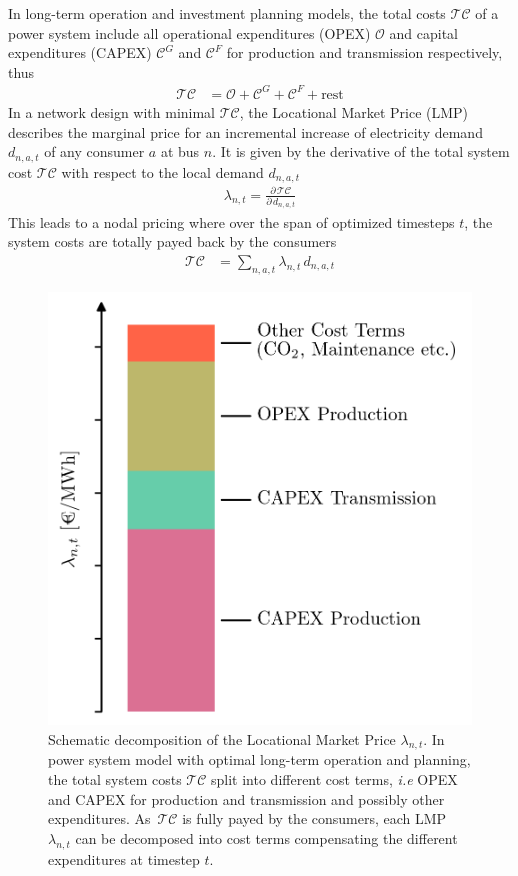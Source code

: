 \documentclass[11pt,twocolumn]{article}
\newcommand{\demand}[1][n]{d_{#1,a,t}}
\newcommand{\lmp}[1][n]{\lambda_{#1,t}}
\newcommand{\totalcost}{\mathcal{TC}}
\newcommand{\totalOpexGeneration}{\mathcal{O}}
\newcommand{\totalCapexGeneration}{\mathcal{C}^G}
\newcommand{\totalCapexFlow}{\mathcal{C}^F}
\newcommand{\pdv}[2]{\frac{\partial #1}{\partial #2}}
\begin{document}
In long-term operation and investment planning models, the total costs $\totalcost$ of a power system include all operational expenditures (OPEX) $\totalOpexGeneration$ and capital expenditures (CAPEX) $\totalCapexGeneration$ and $\totalCapexFlow$ for production  and transmission respectively, thus
\begin{align}
  \totalcost &= \totalOpexGeneration + \totalCapexGeneration +  \totalCapexFlow + \text{rest}
  \label{eq:total_cost_terms}
\end{align}
In a network design with minimal $\totalcost$, the Locational Market Price (LMP) describes the marginal price for an incremental increase of electricity demand $\demand$ of any consumer $a$ at bus $n$. It is given by the derivative of the total system cost $\totalcost$ with respect to the local demand $\demand$
\begin{align}
 \lmp = \pdv{\,\totalcost}{\,\demand}
 \label{eq:total_cost_derivative}
\end{align}
This leads to a nodal pricing where over the span of optimized timesteps $t$, the system costs are totally payed back by the consumers 
\begin{align}
 \totalcost &=  \sum_{n,a,t} \lmp \, \demand
 \label{eq:total_cost_sum}
\end{align}
% 
\begin{figure}[h]
\centering
 \includegraphics[width=.8\linewidth]{figures/price_decomposition.png}
 \caption{Schematic decomposition of the Locational Market Price $\lmp$. In power system model with optimal long-term operation and planning, the total system costs $\totalcost$ split into different cost terms, \textit{i.e} OPEX and CAPEX for production and transmission and possibly other expenditures. As $\,\totalcost$ is fully payed by the consumers, each LMP $\lmp$ can be decomposed into cost terms compensating the different expenditures at timestep $t$.}
 \label{fig:price_decomposition}
\end{figure}
\end{document}
